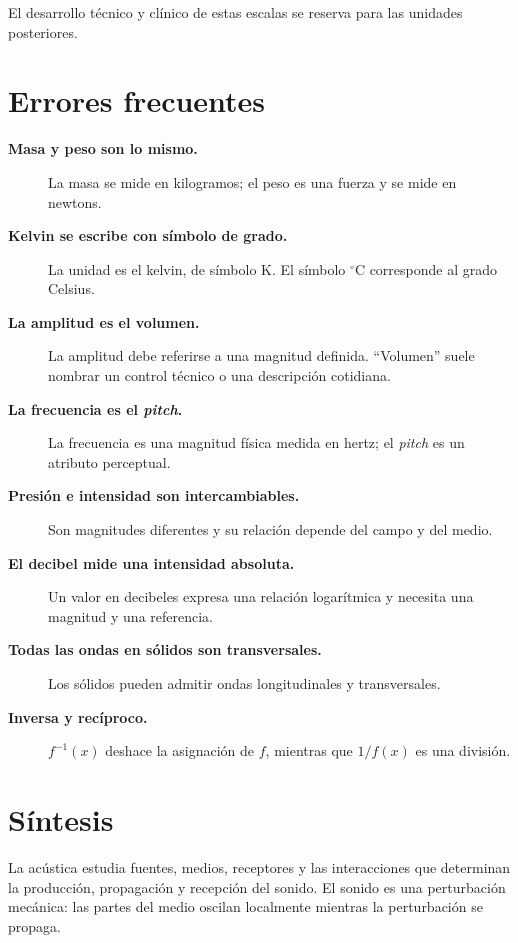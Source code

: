  El desarrollo técnico y clínico de estas escalas se reserva para las unidades posteriores.

\section{Errores frecuentes}
\label{sec:u1-errores}

\begin{description}
    \item[\textbf{Masa y peso son lo mismo.}] La masa se mide en kilogramos; el peso es una fuerza y se mide en newtons.
    \item[\textbf{Kelvin se escribe con símbolo de grado.}] La unidad es el kelvin, de símbolo \(\text{K}\). El símbolo \(^{\circ}\text{C}\) corresponde al grado Celsius.
    \item[\textbf{La amplitud es el volumen.}] La amplitud debe referirse a una magnitud definida. ``Volumen'' suele nombrar un control técnico o una descripción cotidiana.
    \item[\textbf{La frecuencia es el \emph{pitch}.}] La frecuencia es una magnitud física medida en hertz; el \emph{pitch} es un atributo perceptual.
    \item[\textbf{Presión e intensidad son intercambiables.}] Son magnitudes diferentes y su relación depende del campo y del medio.
    \item[\textbf{El decibel mide una intensidad absoluta.}] Un valor en decibeles expresa una relación logarítmica y necesita una magnitud y una referencia.
    \item[\textbf{Todas las ondas en sólidos son transversales.}] Los sólidos pueden admitir ondas longitudinales y transversales.
    \item[\textbf{Inversa y recíproco.}] \(f^{-1}(x)\) deshace la asignación de \(f\), mientras que \(1/f(x)\) es una división.
\end{description}

\section{Síntesis}
\label{sec:u1-sintesis}

La acústica estudia fuentes, medios, receptores y las interacciones que determinan la producción, propagación y recepción del sonido. El sonido es una perturbación mecánica: las partes del medio oscilan localmente mientras la perturbación se propaga.

